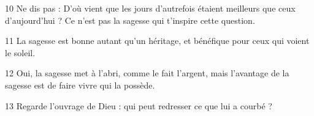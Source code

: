 
10 Ne dis pas : D’où vient que les jours d’autrefois étaient meilleurs que ceux d’aujourd’hui ? Ce n’est pas la sagesse qui t’inspire cette question.

11 La sagesse est bonne autant qu’un héritage, et bénéfique pour ceux qui voient le soleil.

12 Oui, la sagesse met à l’abri, comme le fait l’argent, mais l’avantage de la sagesse est de faire vivre qui la possède.

13 Regarde l’ouvrage de Dieu : qui peut redresser ce que lui a courbé ?
